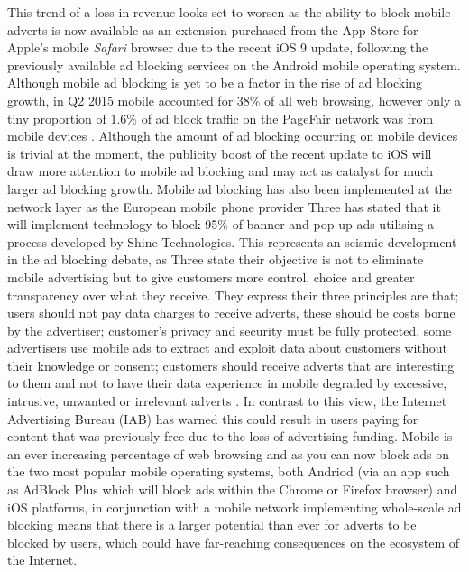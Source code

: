 \documentclass[12pt]{article}
\begin{document}
This trend of a loss in revenue looks set to worsen as the ability to block mobile adverts is now available as an extension purchased from the App Store for Apple's mobile \textit{Safari} browser due to the recent iOS 9 update, following the previously available ad blocking services on the Android mobile operating system. Although mobile ad blocking is yet to be a factor in the rise of ad blocking growth, in Q2 2015 mobile accounted for 38\% of all web browsing, however only a tiny proportion of 1.6\% of ad block traffic on the PageFair network was from mobile devices \parencite{adobeAdBlock}. Although the amount of ad blocking occurring on mobile devices is trivial at the moment, the publicity boost of the recent update to iOS will draw more attention to mobile ad blocking and may act as catalyst for  much larger ad blocking growth. Mobile ad blocking has also been implemented at the network layer as the European mobile phone provider Three has stated that it will implement technology to block 95\% of banner and pop-up ads utilising a process developed by Shine Technologies. This represents an seismic development in the ad blocking debate, as Three state their objective is not to eliminate mobile advertising but to give customers more control, choice and greater transparency over what they receive. They express their three principles are that; users should not pay data charges to receive adverts, these should be costs borne by the advertiser; customer's privacy and security must be fully protected, some advertisers use mobile ads to extract and exploit data about customers without their knowledge or consent; customers should receive adverts that are interesting to them and not to have their data experience in mobile degraded by excessive, intrusive, unwanted or irrelevant adverts \parencite{threeAdBlock}. In contrast to this view, the Internet Advertising Bureau (IAB) has warned this could result in users paying for content that was previously free due to the loss of advertising funding. Mobile is an ever increasing percentage of web browsing and as you can now block ads on the two most popular mobile operating systems, both Andriod (via an app such as AdBlock Plus which will block ads within the Chrome or Firefox browser) and iOS platforms, in conjunction with a  mobile network implementing whole-scale ad blocking means that there is a larger potential than ever for adverts to be blocked by users, which could have far-reaching consequences on the ecosystem of the Internet.  \\
\end{document}
